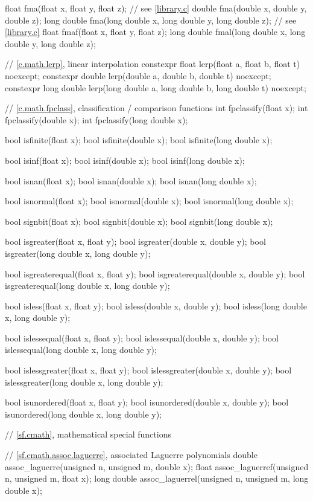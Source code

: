 \begin{codeblock}
{  float fma(float x, float y, float z); // see \ref{library.c}
  double fma(double x, double y, double z);
  long double fma(long double x, long double y, long double z); // see \ref{library.c}
  float fmaf(float x, float y, float z);
  long double fmal(long double x, long double y, long double z);

  // \ref{c.math.lerp}, linear interpolation
  constexpr float lerp(float a, float b, float t) noexcept;
  constexpr double lerp(double a, double b, double t) noexcept;
  constexpr long double lerp(long double a, long double b, long double t) noexcept;

  // \ref{c.math.fpclass}, classification / comparison functions
  int fpclassify(float x);
  int fpclassify(double x);
  int fpclassify(long double x);

  bool isfinite(float x);
  bool isfinite(double x);
  bool isfinite(long double x);

  bool isinf(float x);
  bool isinf(double x);
  bool isinf(long double x);

  bool isnan(float x);
  bool isnan(double x);
  bool isnan(long double x);

  bool isnormal(float x);
  bool isnormal(double x);
  bool isnormal(long double x);

  bool signbit(float x);
  bool signbit(double x);
  bool signbit(long double x);

  bool isgreater(float x, float y);
  bool isgreater(double x, double y);
  bool isgreater(long double x, long double y);

  bool isgreaterequal(float x, float y);
  bool isgreaterequal(double x, double y);
  bool isgreaterequal(long double x, long double y);

  bool isless(float x, float y);
  bool isless(double x, double y);
  bool isless(long double x, long double y);

  bool islessequal(float x, float y);
  bool islessequal(double x, double y);
  bool islessequal(long double x, long double y);

  bool islessgreater(float x, float y);
  bool islessgreater(double x, double y);
  bool islessgreater(long double x, long double y);

  bool isunordered(float x, float y);
  bool isunordered(double x, double y);
  bool isunordered(long double x, long double y);

  // \ref{sf.cmath}, mathematical special functions

  // \ref{sf.cmath.assoc.laguerre}, associated Laguerre polynomials
  double       assoc_laguerre(unsigned n, unsigned m, double x);
  float        assoc_laguerref(unsigned n, unsigned m, float x);
  long double  assoc_laguerrel(unsigned n, unsigned m, long double x);

}
\end{codeblock}
